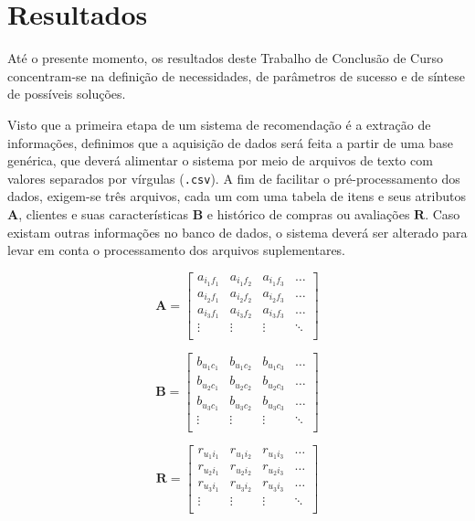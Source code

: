 \chapter[Resultados]{Resultados}
\label{chap:resultados}

Até o presente momento, os resultados deste Trabalho de Conclusão de Curso concentram-se na definição de necessidades, de parâmetros de sucesso e de síntese de possíveis soluções. 

Visto que a primeira etapa de um sistema de recomendação é a extração de informações, definimos que a aquisição de dados será feita a partir de uma base genérica, que deverá alimentar o sistema por meio de arquivos de texto com valores separados por vírgulas (\texttt{.csv}). A fim de facilitar o pré-processamento dos dados, exigem-se três arquivos, cada um com uma tabela de itens e seus atributos $\mathbf{A}$, clientes e suas características $\mathbf{B}$ e histórico de compras ou avaliações $\mathbf{R}$. Caso existam outras informações no banco de dados, o sistema deverá ser alterado para levar em conta o processamento dos arquivos suplementares.

\begin{equation} 
\mathbf{A} = 
\begin{bmatrix} 
 a_{i_1 f_1} &  a_{i_1 f_2} &  a_{i_1 f_3}  & \dots   \\
 a_{i_2 f_1} &  a_{i_2 f_2} &  a_{i_2 f_3}  & \dots   \\
 a_{i_3 f_1} &  a_{i_3 f_2} &  a_{i_3 f_3}  & \dots  \\ 
 \vdots &  \vdots &  \vdots  & \ddots   \\
 \end{bmatrix}
\end{equation}

\begin{equation}
	\mathbf{B} = 
\begin{bmatrix} 
 b_{u_1 c_1} &  b_{u_1 c_2} &  b_{u_1 c_3}  & \dots   \\
 b_{u_2 c_1} &  b_{u_2 c_2} &  b_{u_2 c_3}  & \dots   \\
 b_{u_3 c_1} &  b_{u_3 c_2} &  b_{u_3 c_3}  & \dots  \\ 
 \vdots &  \vdots &  \vdots  & \ddots   \\
 \end{bmatrix}
\end{equation}

\begin{equation}
	  \mathbf{R} = 
\begin{bmatrix} 
  r_{u_1 i_1} &  r_{u_1 i_2} &  r_{u_1 i_3}  & \dots   \\
 r_{u_2 i_1} &  r_{u_2 i_2} &  r_{u_2 i_3}  & \dots   \\
 r_{u_3 i_1} &  r_{u_3 i_2} &  r_{u_3 i_3}  & \dots  \\ 
 \vdots &  \vdots &  \vdots  & \ddots   \\
\end{bmatrix}
\end{equation}

